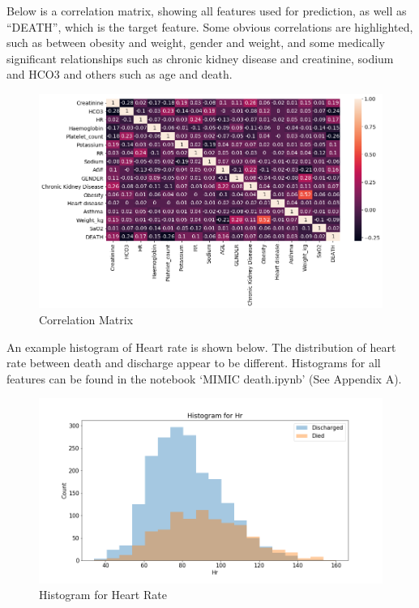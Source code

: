 \documentclass[12pt]{article}
\begin{document}
Below is a correlation matrix, showing all features used for prediction, as well as ``DEATH'', which is the target feature. Some obvious correlations are highlighted, such as between obesity and weight, gender and weight, and some medically significant relationships such as chronic kidney disease and creatinine, sodium and HCO3 and others such as age and death.

\begin{figure}[H]
\centering\caption{Correlation Matrix}
\includegraphics[scale=0.46]{Correlation Matrix.png}
\end{figure}

An example histogram of Heart rate is shown below. The distribution of heart rate between death and discharge appear to be different. Histograms for all features can be found in the notebook `MIMIC death.ipynb' (See Appendix A).

\begin{figure}[H]
\centering\caption{Histogram for Heart Rate}
\includegraphics[scale=0.5]{Histogram for Hr.png}
\end{figure}
\end{document}
